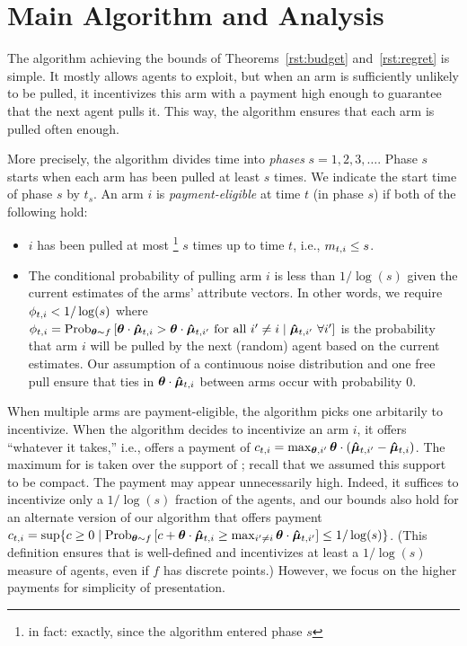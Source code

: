 \section{Main Algorithm and Analysis}
\label{sec:ub}
The algorithm achieving the  bounds of
Theorems~\ref{rst:budget} and~\ref{rst:regret} is simple.
It mostly allows agents to exploit, but when an arm is sufficiently
unlikely to be pulled,
it incentivizes this arm with a payment high enough
to guarantee that the next agent pulls it.
This way, the algorithm ensures that each arm is pulled often enough.

More precisely, the algorithm divides time into \emph{phases}
$s = 1, 2, 3, \ldots$.
Phase $s$ starts when each arm has been pulled at least $s$ times.
We indicate the start time of phase $s$ by $t_s$. An arm $i$ is \emph{payment-eligible} at time $t$ (in phase $s$)
if both of the following hold:

\begin{itemize}
\item $i$ has been pulled at most%
\footnote{in fact: exactly, since the algorithm entered phase $s$}
$s$ times up to time $t$, i.e., $m_{t,i} \leq s$.
\item 
The conditional probability of pulling arm $i$ is less than
$1/\log(s)$ given the current estimates  of the arms'
attribute vectors.  In other words, we require
$\phi_{t,i} < 1/\log(s)$ where 
$\PullProb{t}{i} = \Prob[\AgV \sim \AgentDist]{\AgV \cdot \ArmEV{t}{i} > \AgV
\cdot \ArmEV{t}{i'} \mbox{ for all } i' \neq i \mid \ArmEV{t}{i'}\ \forall i'}$
is the probability that arm $i$ will be pulled
by the next (random) agent based on the current estimates. 
Our assumption of a continuous noise distribution and one free pull
ensure that ties in $\bm{\theta} \cdot \bm{\hat{\mu}}_{t,i}$ between arms occur with
probability $0$.
\end{itemize}


When multiple arms are payment-eligible, the algorithm picks one arbitarily to incentivize.
When the algorithm decides to incentivize an arm $i$,
it offers ``whatever it takes,'' i.e., offers a payment of
$c_{t,i} = \max_{\bm{\theta},i'} \bm{\theta} \cdot (\bm{\hat{\mu}}_{t,i'} - \bm{\hat{\mu}}_{t,i})$.
The maximum for \AgV is taken over the support of \AgentDist;
recall that we assumed this support to be compact.
The payment  may appear unnecessarily high.
Indeed, it suffices to
incentivize only a $1/\log(s)$ fraction of the agents,
and our bounds also hold for an alternate version of our algorithm that 
offers payment
$\Pay{t}{i} = \sup \Set{c \geq 0}{%
\Prob[\AgV \sim \AgentDist]{c + \AgV \cdot \ArmEV{t}{i} \geq \max_{i'\ne i} \AgV \cdot \ArmEV{t}{i'}} \leq 1/\log(s)}$.
(This definition ensures that  is well-defined
and incentivizes at least a $1/\log(s)$ measure of agents,
even if $f$ has discrete points.)
However, we focus on the higher payments for simplicity of presentation.

